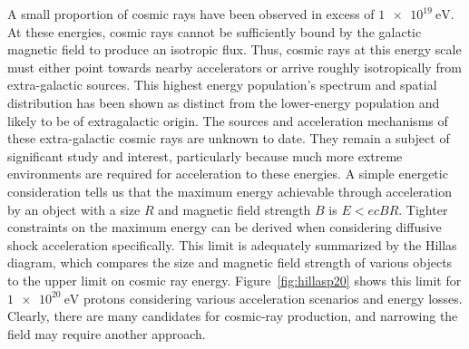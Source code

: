 A small proportion of cosmic rays have been observed in excess of $\SI{1e19}\eV$.
At these energies, cosmic rays cannot be sufficiently bound by the galactic magnetic field to produce an isotropic flux.
Thus, cosmic rays at this energy scale must either point towards nearby accelerators or arrive roughly isotropically from extra-galactic sources.
This highest energy population's spectrum and spatial distribution has been shown as distinct from the lower-energy population and likely to be of extragalactic origin.
The sources and acceleration mechanisms of these extra-galactic cosmic rays are unknown to date.
They remain a subject of significant study and interest, particularly because much more extreme environments are required for acceleration to these energies.
A simple energetic consideration tells us that the maximum energy achievable through acceleration by an object with a size $R$ and magnetic field strength $B$ is $E<ecBR$.
Tighter constraints on the maximum energy can be derived when considering diffusive shock acceleration specifically.
This limit is adequately summarized by the Hillas diagram, which compares the size and magnetic field strength of various objects to the upper limit on cosmic ray energy.
Figure~\ref{fig:hillasp20} shows this limit for $\SI{1e20}\eV$ protons considering various acceleration scenarios and energy losses.
Clearly, there are many candidates for cosmic-ray production, and narrowing the field may require another approach.

